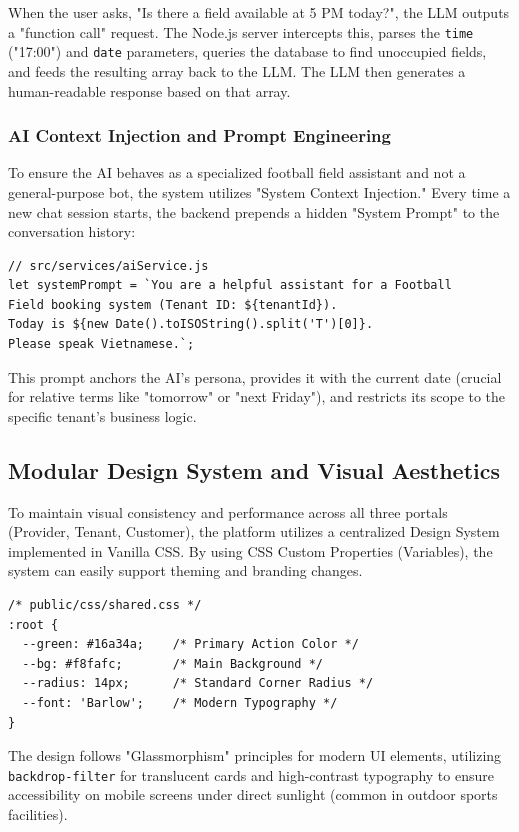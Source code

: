When the user asks, "Is there a field available at 5 PM today?", the LLM outputs a "function call" request. The Node.js server intercepts this, parses the \texttt{time} ("17:00") and \texttt{date} parameters, queries the database to find unoccupied fields, and feeds the resulting array back to the LLM. The LLM then generates a human-readable response based on that array.

\subsubsection{AI Context Injection and Prompt Engineering}
To ensure the AI behaves as a specialized football field assistant and not a general-purpose bot, the system utilizes "System Context Injection." Every time a new chat session starts, the backend prepends a hidden "System Prompt" to the conversation history:

\begin{verbatim}
// src/services/aiService.js
let systemPrompt = `You are a helpful assistant for a Football 
Field booking system (Tenant ID: ${tenantId}). 
Today is ${new Date().toISOString().split('T')[0]}.
Please speak Vietnamese.`;
\end{verbatim}

This prompt anchors the AI's persona, provides it with the current date (crucial for relative terms like "tomorrow" or "next Friday"), and restricts its scope to the specific tenant's business logic.

\subsection{Modular Design System and Visual Aesthetics}
To maintain visual consistency and performance across all three portals (Provider, Tenant, Customer), the platform utilizes a centralized Design System implemented in Vanilla CSS. By using CSS Custom Properties (Variables), the system can easily support theming and branding changes.

\begin{verbatim}
/* public/css/shared.css */
:root {
  --green: #16a34a;    /* Primary Action Color */
  --bg: #f8fafc;       /* Main Background */
  --radius: 14px;      /* Standard Corner Radius */
  --font: 'Barlow';    /* Modern Typography */
}
\end{verbatim}

The design follows "Glassmorphism" principles for modern UI elements, utilizing \texttt{backdrop-filter} for translucent cards and high-contrast typography to ensure accessibility on mobile screens under direct sunlight (common in outdoor sports facilities).

